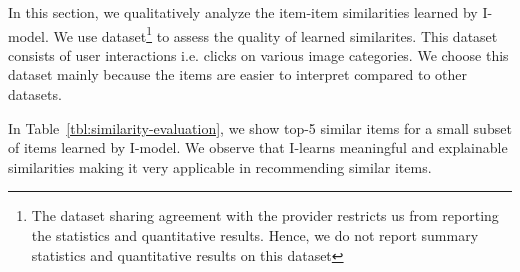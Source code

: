 In this section, we qualitatively analyze the item-item similarities learned by I-\LinearLow model. We use \Fotolia dataset\footnote{\scriptsize The dataset sharing agreement with the provider restricts us from reporting the statistics and quantitative results. Hence, we do not report summary statistics and quantitative results on this dataset} to assess the quality of learned similarites. This dataset consists of user interactions i.e. clicks on various image categories.
We choose this dataset mainly because the items are easier to interpret compared to other datasets.

In Table~\ref{tbl:similarity-evaluation}, we show top-5 similar items for a small subset of items learned by I-\LinearLow model. We observe that  I-\LinearLow learns meaningful and explainable similarities making it very applicable in recommending similar items. 

\begin{table*}[!htb]

	\centering
	\caption{Top-5 similar items learned by I-\LinearLow model.}
	\label{tbl:similarity-evaluation}
\end{table*}
